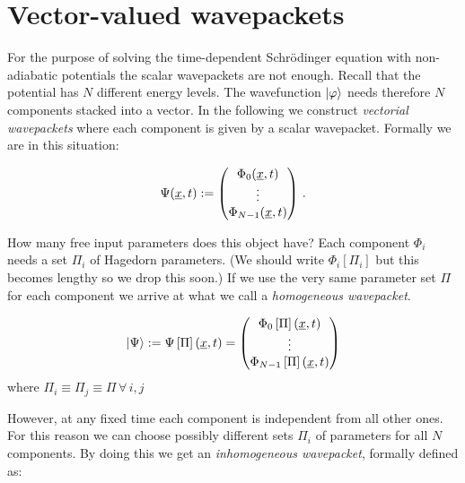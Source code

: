 \section{Vector-valued wavepackets}


For the purpose of solving the time-dependent Schrödinger equation with non-adiabatic
potentials the scalar wavepackets are not enough. Recall that the potential has $N$
different energy levels. The wavefunction $\Ket{\varphi}$ needs therefore $N$ components
stacked into a vector. In the following we construct \emph{vectorial wavepackets}
where each component is given by a scalar wavepacket. Formally we are in this situation:

\begin{equation}
  \Psi(\underline{x}, t) :=
  \begin{pmatrix}
    \Phi_0(\underline{x}, t) \\
    \vdots \\
    \Phi_{N-1}(\underline{x}, t)
  \end{pmatrix} \,.
\end{equation}

How many free input parameters does this object have? Each component $\Phi_i$ needs
a set $\Pi_i$ of Hagedorn parameters. (We should write $\Phi_i\left[\Pi_i\right]$
but this becomes lengthy so we drop this soon.) If we use the very same parameter
set $\Pi$ for each component we arrive at what we call a \emph{homogeneous wavepacket}.

\begin{definition}
  \begin{equation} \label{eq:vectorial_wavepacket_hom}
    \Ket{\Psi} :=
    \Psi\left[\Pi\right](\underline{x}, t)
    =
    \begin{pmatrix}
      \Phi_0\left[\Pi\right](\underline{x}, t) \\
      \vdots \\
      \Phi_{N-1}\left[\Pi\right](\underline{x}, t) \\
    \end{pmatrix}
  \end{equation}
  where $\Pi_i \equiv \Pi_j \equiv \Pi \,\forall\, i,j$
\end{definition}

However, at any fixed time each component is independent from all other ones. For
this reason we can choose possibly different sets $\Pi_i$ of parameters for all
$N$ components. By doing this we get an \emph{inhomogeneous wavepacket}, formally
defined as:

